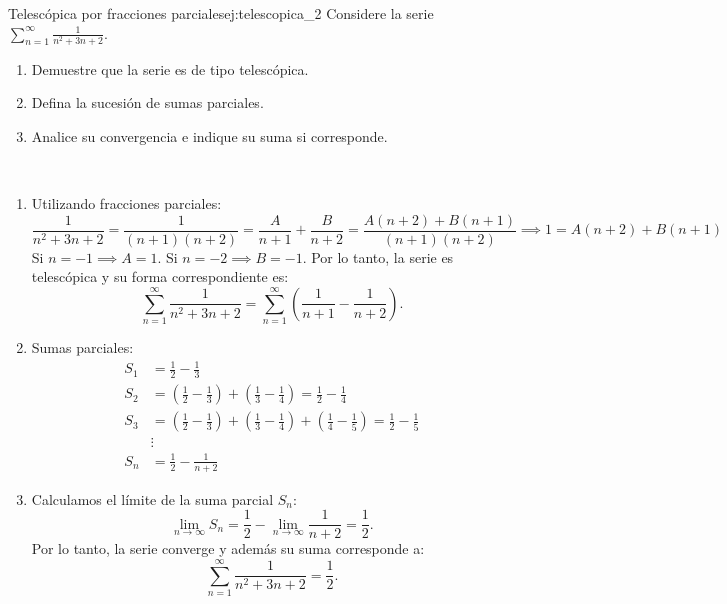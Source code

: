 \begin{example}{Telescópica por fracciones parciales}{ej:telescopica_2}
    Considere la serie $\displaystyle\sum_{n=1}^{\infty}\frac{1}{n^2+3n+2}$.
    \begin{enumerate}
        \item Demuestre que la serie es de tipo telescópica.
        \item Defina la sucesión de sumas parciales.
        \item Analice su convergencia e indique su suma si corresponde.
    \end{enumerate}
\end{example}

\begin{soln}
    $\left. \right.$
    \begin{enumerate}
        \item Utilizando fracciones parciales:
        \[ \frac{1}{n^2+3n+2} = \frac{1}{(n+1)(n+2)} = \frac{A}{n+1} + \frac{B}{n+2} = \frac{A(n+2) + B(n+1)}{(n+1)(n+2)} \implies 1 = A(n+2) + B(n+1) \]
        Si $n = -1 \implies A = 1$. Si $n = -2 \implies B = -1$. Por lo tanto, la serie es telescópica y su forma correspondiente es:
        \[ \displaystyle\sum_{n=1}^{\infty}\frac{1}{n^2+3n+2} = \sum_{n=1}^{\infty}\left(\frac{1}{n+1} - \frac{1}{n+2}\right). \]
        
        \item Sumas parciales:
        \begin{align*}
            S_1 &= \frac{1}{2} - \frac{1}{3} \\
            S_2 &= \left(\frac{1}{2} - \frac{1}{3}\right) + \left(\frac{1}{3} - \frac{1}{4}\right) = \frac{1}{2} - \frac{1}{4} \\
            S_3 &= \left(\frac{1}{2} - \frac{1}{3}\right) + \left(\frac{1}{3} - \frac{1}{4}\right) + \left(\frac{1}{4} - \frac{1}{5}\right) = \frac{1}{2} - \frac{1}{5} \\
            &\vdots \\
            S_n &= \frac{1}{2} - \frac{1}{n+2}
        \end{align*}
        
        \item Calculamos el límite de la suma parcial $S_n$:
        \[ \lim_{n\to\infty}S_n = \frac{1}{2} - \lim_{n\to\infty}\frac{1}{n+2} = \frac{1}{2}. \]
        Por lo tanto, la serie converge y además su suma corresponde a:
        \[ \displaystyle \sum_{n=1}^{\infty}\frac{1}{n^2+3n+2} = \frac{1}{2}. \]
    \end{enumerate}
\end{soln}

